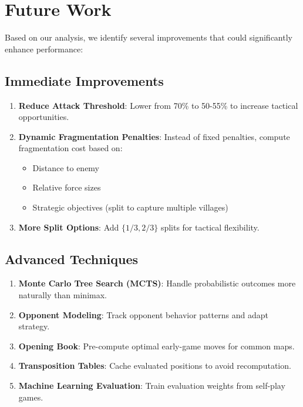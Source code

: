 \documentclass[11pt,a4paper]{article}
\begin{document}
\section{Future Work}

Based on our analysis, we identify several improvements that could significantly enhance performance:

\subsection{Immediate Improvements}

\begin{enumerate}
    \item \textbf{Reduce Attack Threshold}: Lower from 70\% to 50-55\% to increase tactical opportunities.

    \item \textbf{Dynamic Fragmentation Penalties}: Instead of fixed penalties, compute fragmentation cost based on:
    \begin{itemize}
        \item Distance to enemy
        \item Relative force sizes
        \item Strategic objectives (split to capture multiple villages)
    \end{itemize}

    \item \textbf{More Split Options}: Add $\{1/3, 2/3\}$ splits for tactical flexibility.
\end{enumerate}

\subsection{Advanced Techniques}

\begin{enumerate}
    \item \textbf{Monte Carlo Tree Search (MCTS)}: Handle probabilistic outcomes more naturally than minimax.

    \item \textbf{Opponent Modeling}: Track opponent behavior patterns and adapt strategy.

    \item \textbf{Opening Book}: Pre-compute optimal early-game moves for common maps.

    \item \textbf{Transposition Tables}: Cache evaluated positions to avoid recomputation.

    \item \textbf{Machine Learning Evaluation}: Train evaluation weights from self-play games.
\end{enumerate}
\end{document}
